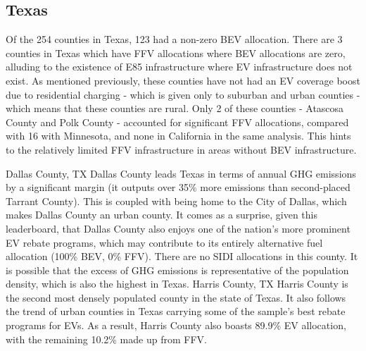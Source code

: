 \documentclass[answers]{exam}
\begin{document}
\subsection{Texas}
Of the 254 counties in Texas, 123 had a non-zero BEV allocation. There are 3 counties in Texas which have FFV allocations where BEV allocations are zero, alluding to the existence of E85 infrastructure where EV infrastructure does not exist. As mentioned previously, these counties have not had an EV coverage boost due to residential charging - which is given only to suburban and urban counties - which means that these counties are rural. Only 2 of these counties - Atascosa County and Polk County - accounted for significant FFV allocations, compared with 16 with Minnesota, and none in California in the same analysis. This hints to the relatively limited FFV infrastructure in areas without BEV infrastructure.
\begin{outline}
\1 Dallas County, TX
\2 Dallas County leads Texas in terms of annual GHG emissions by a significant margin (it outputs over 35\% more emissions than second-placed Tarrant County). This is coupled with being home to the City of Dallas, which makes Dallas County an urban county. It comes as a surprise, given this leaderboard, that Dallas County also enjoys one of the nation's more prominent EV rebate programs, which may contribute to its entirely alternative fuel allocation (100\% BEV, 0\% FFV). There are no SIDI allocations in this county. It is possible that the excess of GHG emissions is representative of the population density, which is also the highest in Texas.
\1 Harris County, TX
\2 Harris County is the second most densely populated county in the state of Texas. It also follows the trend of urban counties in Texas carrying some of the sample's best rebate programs for EVs. As a result, Harris County also boasts 89.9\% EV allocation, with the remaining 10.2\% made up from FFV. 
\end{outline}
\end{document}
